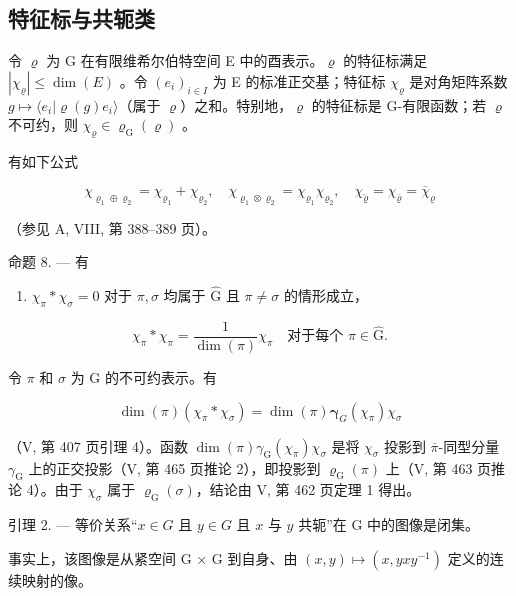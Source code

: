 \subsection{特征标与共轭类}

令 \(\varrho\) 为 G 在有限维希尔伯特空间 E 中的酉表示。\(\varrho\) 的特征标满足 \(|\chi_{\varrho}| \leqslant \dim(E)\) 。令 \((e_i)_{i \in I}\) 为 E 的标准正交基；特征标 \(\chi_{\varrho}\) 是对角矩阵系数 \(g \mapsto \langle e_i | \varrho(g)e_i \rangle\)（属于 \(\varrho\)）之和。特别地，\(\varrho\) 的特征标是 G-有限函数；若 \(\varrho\) 不可约，则 \(\chi_{\varrho} \in \varrho_{\mathrm{G}}(\varrho)\) 。

有如下公式

\[
\chi_ {\varrho_ {1} \oplus \varrho_ {2}} = \chi_ {\varrho_ {1}} + \chi_ {\varrho_ {2}}, \quad \chi_ {\varrho_ {1} \otimes \varrho_ {2}} = \chi_ {\varrho_ {1}} \chi_ {\varrho_ {2}}, \quad \chi_ {\breve {\varrho}} = \chi_ {\overline {{\varrho}}} = \overline {{\chi}} _ {\varrho}
\]

（参见 A, VIII, 第 388--389 页）。

命题 8. --- 有

\begin{enumerate}
\def\labelenumi{(\arabic{enumi})}
\tightlist
\item
  \(\chi_{\pi}*\chi_{\sigma} = 0\) 对于 \(\pi, \sigma\) 均属于 \(\widehat{\mathrm{G}}\) 且 \(\pi \neq \sigma\) 的情形成立，
\end{enumerate}

\[
\chi_ {\pi} * \chi_ {\pi} = \frac {1}{\dim (\pi)} \chi_ {\pi} \quad\text{对于每个 }\pi\in\widehat {\mathrm{G}}.\tag{2}
\]

令 \(\pi\) 和 \(\sigma\) 为 G 的不可约表示。有

\[
\dim (\pi) \left(\chi_ {\pi} * \chi_ {\sigma}\right) = \dim (\pi) \boldsymbol {\gamma} _ {G} \left(\chi_ {\pi}\right) \chi_ {\sigma}
\]

（V, 第 407 页引理 4）。函数 \(\dim(\pi)\gamma_{\mathrm{G}}(\chi_{\pi})\chi_{\sigma}\) 是将 \(\chi_{\sigma}\) 投影到 \(\overline{\pi}\)-同型分量 \(\gamma_{\mathrm{G}}\) 上的正交投影（V, 第 465 页推论 2），即投影到 \(\varrho_{\mathrm{G}}(\pi)\) 上（V, 第 463 页推论 4）。由于 \(\chi_{\sigma}\) 属于 \(\varrho_{\mathrm{G}}(\sigma)\)，结论由 V, 第 462 页定理 1 得出。

引理 2. --- 等价关系“\(x \in G\) 且 \(y \in G\) 且 \(x\) 与 \(y\) 共轭”在 G 中的图像是闭集。

事实上，该图像是从紧空间 G × G 到自身、由 \((x, y) \mapsto (x, yxy^{-1})\) 定义的连续映射的像。

